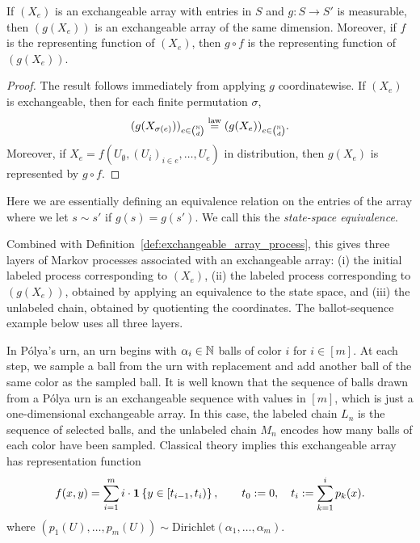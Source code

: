\begin{lemma}
\label{lem:state_equivalence}
    If $(X_e)$ is an exchangeable array with entries in $S$ and $g:S \to S'$ is measurable, then $(g(X_e))$ is an exchangeable array of the same dimension. Moreover, if $f$ is the representing function of $(X_e)$, then $g \circ f$ is the representing function of $(g(X_e))$.

\end{lemma}

\begin{proof}
The result follows immediately from applying $g$ coordinatewise. If $(X_e)$ is exchangeable, then for each finite permutation $\sigma$,
\[
(g(X_{\sigma(e)}))_{e \in \binom{\mathbb{N}}{d}} \overset{\mathrm{law}}{=} (g(X_e))_{e \in \binom{\mathbb{N}}{d}}.
\]
Moreover, if $X_e = f(U_\emptyset,(U_i)_{i \in e},\ldots,U_e)$ in distribution, then $g(X_e)$ is represented by $g \circ f$.
\end{proof}

\noindent Here we are essentially defining an equivalence relation on the entries of the array where we let $s \sim s'$ if $g(s) = g(s')$.
We call this the \textit{state-space equivalence}.

Combined with Definition~\ref{def:exchangeable_array_process}, this gives three layers of Markov processes associated with an exchangeable array: (i) the initial labeled process corresponding to $(X_e)$, (ii) the labeled process corresponding to $(g(X_e))$, obtained by applying an equivalence to the state space, and (iii) the unlabeled chain, obtained by quotienting the coordinates. The ballot-sequence example below uses all three layers.


\begin{example}
\label{ex:polyas_urn}
    In P\'olya's urn, an urn begins with $\alpha_i \in \mathbb{N}$ balls of color $i$ for $i \in [m]$. At each step,
    we sample a ball from the urn with replacement and add another ball of the same color as the sampled ball.
    It is well known that the sequence of balls drawn from a P\'olya urn is an exchangeable sequence with values in $[m]$,
    which is just a one-dimensional exchangeable array. In this case, the labeled chain $L_n$
    is the sequence of selected balls, and the unlabeled chain $M_n$ encodes how many balls of each color
    have been sampled. Classical theory implies this exchangeable array has representation function
    \[f(x,y) = \sum_{i=1}^m i \cdot \mathbf{1} \left\{y \in [t_{i-1}, t_{i})\right\},
    \qquad t_0:=0,\quad t_i := \sum_{k=1}^i p_k(x).\]
    \noindent where $(p_1(U),\ldots,p_m(U)) \sim \mathrm{Dirichlet}(\alpha_1,\ldots,\alpha_m)$.
\end{example}

